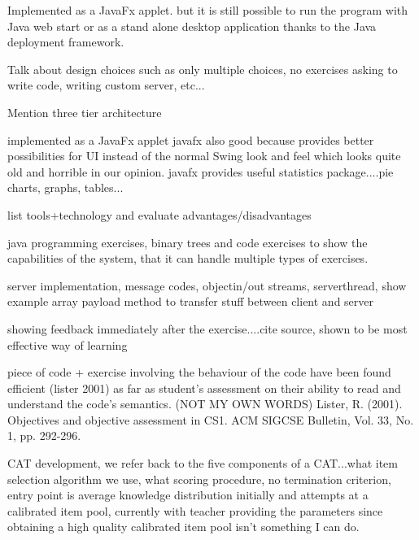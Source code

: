 Implemented as a JavaFx applet. but it is still possible to run the program with Java web start or as a stand alone desktop application thanks to the Java deployment framework.\newline

Talk about design choices such as only multiple choices, no exercises asking to write code, writing custom server, etc...\newline

Mention three tier architecture\newline

implemented as a JavaFx applet\newline
javafx also good because provides better possibilities for UI instead of the normal Swing look and feel which looks quite old and horrible in our opinion.\newline
javafx provides useful statistics package....pie charts, graphs, tables...\newline

list tools+technology and evaluate advantages/disadvantages\newline

java programming exercises, binary trees and code exercises to show the capabilities of the system, that it can handle multiple types of exercises.\newline

server implementation, message codes, objectin/out streams, serverthread, show example array payload method to transfer stuff between client and server\newline

showing feedback immediately after the exercise....cite source, shown to be most effective way of learning\newline

piece of code + exercise involving the behaviour of the code have been found efficient (lister 2001) as far as student's assessment on their ability to read and understand the code's semantics. (NOT MY OWN WORDS) Lister, R. (2001). Objectives and objective assessment in CS1. ACM SIGCSE Bulletin, Vol. 33, No. 1, pp. 292-296. \newline

CAT development, we refer back to the five components of a CAT...what item selection algorithm we use, what scoring procedure, no termination criterion, entry point is average knowledge distribution initially and attempts at a calibrated item pool, currently with teacher providing the parameters since obtaining a high quality calibrated item pool isn't something I can do.